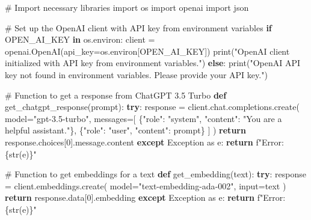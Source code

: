 \documentclass[
  letterpaper,
  DIV=11,
  numbers=noendperiod]{scrartcl}
\newenvironment{Shaded}{\begin{snugshade}}{\end{snugshade}}
\newcommand{\BuiltInTok}[1]{\textcolor[rgb]{0.00,0.23,0.31}{#1}}
\newcommand{\CommentTok}[1]{\textcolor[rgb]{0.37,0.37,0.37}{#1}}
\newcommand{\ControlFlowTok}[1]{\textcolor[rgb]{0.00,0.23,0.31}{\textbf{#1}}}
\newcommand{\DecValTok}[1]{\textcolor[rgb]{0.68,0.00,0.00}{#1}}
\newcommand{\ImportTok}[1]{\textcolor[rgb]{0.00,0.46,0.62}{#1}}
\newcommand{\KeywordTok}[1]{\textcolor[rgb]{0.00,0.23,0.31}{\textbf{#1}}}
\newcommand{\NormalTok}[1]{\textcolor[rgb]{0.00,0.23,0.31}{#1}}
\newcommand{\OperatorTok}[1]{\textcolor[rgb]{0.37,0.37,0.37}{#1}}
\newcommand{\PreprocessorTok}[1]{\textcolor[rgb]{0.68,0.00,0.00}{#1}}
\newcommand{\SpecialCharTok}[1]{\textcolor[rgb]{0.37,0.37,0.37}{#1}}
\newcommand{\SpecialStringTok}[1]{\textcolor[rgb]{0.13,0.47,0.30}{#1}}
\newcommand{\StringTok}[1]{\textcolor[rgb]{0.13,0.47,0.30}{#1}}
\begin{document}
\begin{Shaded}
\begin{Highlighting}[]
\CommentTok{\# Import necessary libraries}
\ImportTok{import}\NormalTok{ os}
\ImportTok{import}\NormalTok{ openai}
\ImportTok{import}\NormalTok{ json}

\CommentTok{\# Set up the OpenAI client with API key from environment variables}
\ControlFlowTok{if} \StringTok{\textquotesingle{}OPEN\_AI\_KEY\textquotesingle{}} \KeywordTok{in}\NormalTok{ os.environ:}
\NormalTok{    client }\OperatorTok{=}\NormalTok{ openai.OpenAI(api\_key}\OperatorTok{=}\NormalTok{os.environ[}\StringTok{\textquotesingle{}OPEN\_AI\_KEY\textquotesingle{}}\NormalTok{])}
    \BuiltInTok{print}\NormalTok{(}\StringTok{"OpenAI client initialized with API key from environment variables."}\NormalTok{)}
\ControlFlowTok{else}\NormalTok{:}
    \BuiltInTok{print}\NormalTok{(}\StringTok{"OpenAI API key not found in environment variables. Please provide your API key."}\NormalTok{)}
    
\CommentTok{\# Function to get a response from ChatGPT 3.5 Turbo}
\KeywordTok{def}\NormalTok{ get\_chatgpt\_response(prompt):}
    \ControlFlowTok{try}\NormalTok{:}
\NormalTok{        response }\OperatorTok{=}\NormalTok{ client.chat.completions.create(}
\NormalTok{            model}\OperatorTok{=}\StringTok{"gpt{-}3.5{-}turbo"}\NormalTok{,}
\NormalTok{            messages}\OperatorTok{=}\NormalTok{[}
\NormalTok{                \{}\StringTok{"role"}\NormalTok{: }\StringTok{"system"}\NormalTok{, }\StringTok{"content"}\NormalTok{: }\StringTok{"You are a helpful assistant."}\NormalTok{\},}
\NormalTok{                \{}\StringTok{"role"}\NormalTok{: }\StringTok{"user"}\NormalTok{, }\StringTok{"content"}\NormalTok{: prompt\}}
\NormalTok{            ]}
\NormalTok{        )}
        \ControlFlowTok{return}\NormalTok{ response.choices[}\DecValTok{0}\NormalTok{].message.content}
    \ControlFlowTok{except} \PreprocessorTok{Exception} \ImportTok{as}\NormalTok{ e:}
        \ControlFlowTok{return} \SpecialStringTok{f"Error: }\SpecialCharTok{\{}\BuiltInTok{str}\NormalTok{(e)}\SpecialCharTok{\}}\SpecialStringTok{"}

\CommentTok{\# Function to get embeddings for a text}
\KeywordTok{def}\NormalTok{ get\_embedding(text):}
    \ControlFlowTok{try}\NormalTok{:}
\NormalTok{        response }\OperatorTok{=}\NormalTok{ client.embeddings.create(}
\NormalTok{            model}\OperatorTok{=}\StringTok{"text{-}embedding{-}ada{-}002"}\NormalTok{,}
            \BuiltInTok{input}\OperatorTok{=}\NormalTok{text}
\NormalTok{        )}
        \ControlFlowTok{return}\NormalTok{ response.data[}\DecValTok{0}\NormalTok{].embedding}
    \ControlFlowTok{except} \PreprocessorTok{Exception} \ImportTok{as}\NormalTok{ e:}
        \ControlFlowTok{return} \SpecialStringTok{f"Error: }\SpecialCharTok{\{}\BuiltInTok{str}\NormalTok{(e)}\SpecialCharTok{\}}\SpecialStringTok{"}


\end{Highlighting}
\end{Shaded}
\end{document}
